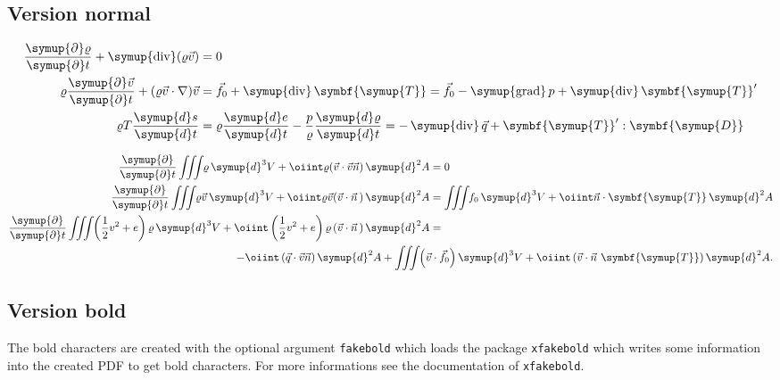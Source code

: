 \documentclass[english,log-declarations=false]{article}
\DeclareMathOperator{\Div}{\symup{div}}
\DeclareMathOperator{\Grad}{\symup{grad}}
\begin{document}
\def\Q#1#2{\frac{\uppartial #1}{\uppartial #2}}
\def\half{\frac{1}{2}}
\def\vvec#1{\vv{#1}}
\newcommand\uppartial{\symup{\partial}}
\newcommand*\diff{\mathop{}\!\symup{d}}
\newcommand*\<{\negthickspace}
\newcommand*\TT{\symbf{\symup{T}}}
\def\DD{\symbf{\symup{D}}}



\subsection{Version normal}

\begin{align}
\begin{aligned}
  \Q{\varrho}{t}+\Div(\varrho\vec{v}) &= 0 \\
  \varrho\Q{\vec{v}}{t}+(\varrho\vec{v}\cdot\nabla)\vec{v}   &= \vec{f}_0+\Div\TT=\vec{f}_0
	-\Grad p+\Div\TT' \\
  \varrho T\frac{\diff s}{\diff t}               &= \varrho\frac{\diff e}{\diff t}
    -\frac{p}{\varrho}\frac{\diff\varrho}{\diff t}=-\Div\vec{q}+\TT':\DD 
\end{aligned}
\end{align}

\begin{align}
 \Q{}{t}\iiint\<\varrho\diff^3V+\oiint\varrho(\vec{v}\cdot\vec{v}\vec{n}) \diff^2 A &= 0\\
 \Q{}{t}\iiint\<\varrho\vec{v}\diff^3V+\oiint\varrho\vec{v}(\vec{v}\cdot\vec{n}\,)\diff^2A &=
        \iiint\<f_0\diff^3V+\oiint\vec{n}\cdot\TT\diff^2A \\
 \Q{}{t}\iiint\<\left(\half v^2+e\right)\varrho\diff^3V+\oiint\left(\half v^2+e\right)
        \varrho\left(\vec{v}\cdot\vec{n}\,\right)\diff^2A                                & =\\
 \multispan2{\hfill${\displaystyle-\oiint\left(\vec{q}\cdot\vec{v}\vec{n}\right)\diff^2A+
         \iiint\<\left(\vec{v}\cdot\vec{f}_0\right)\diff^3V+\oiint\left(\vec{v}
         \cdot\vec{n}~\TT\right)\diff^2A}$}.\nonumber
\end{align}


\subsection{Version bold}

The bold characters are created with the %
optional argument \texttt{fakebold} which loads the
package \texttt{xfakebold} which writes some information into the created PDF to get bold
characters. For more informations see the documentation of \texttt{xfakebold}.
\end{document}
